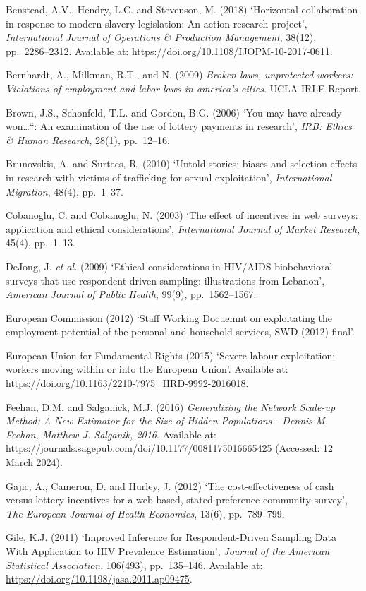 \documentclass[
  12pt,
  letterpaper,
  DIV=11,
  numbers=noendperiod]{scrartcl}
\begin{document}
Benstead, A.V., Hendry, L.C. and Stevenson, M. (2018) `Horizontal
collaboration in response to modern slavery legislation: An action
research project', \emph{International Journal of Operations \&
Production Management}, 38(12), pp.~2286--2312. Available at:
\url{https://doi.org/10.1108/IJOPM-10-2017-0611}.

Bernhardt, A., Milkman, R.T., and N. (2009) \emph{Broken laws,
unprotected workers: Violations of employment and labor laws in
america's cities}. UCLA IRLE Report.

Brown, J.S., Schonfeld, T.L. and Gordon, B.G. (2006) `You may have
already won\ldots``: An examination of the use of lottery payments in
research', \emph{IRB: Ethics \& Human Research}, 28(1), pp.~12--16.

Brunovskis, A. and Surtees, R. (2010) `Untold stories: biases and
selection effects in research with victims of trafficking for sexual
exploitation', \emph{International Migration}, 48(4), pp.~1--37.

Cobanoglu, C. and Cobanoglu, N. (2003) `The effect of incentives in web
surveys: application and ethical considerations', \emph{International
Journal of Market Research}, 45(4), pp.~1--13.

DeJong, J. \emph{et al.} (2009) `Ethical considerations in HIV/AIDS
biobehavioral surveys that use respondent-driven sampling: illustrations
from Lebanon', \emph{American Journal of Public Health}, 99(9),
pp.~1562--1567.

European Commission (2012) `Staff Working Docuemnt on exploitating the
employment potential of the personal and household services, SWD (2012)
final'.

European Union for Fundamental Rights (2015) `Severe labour
exploitation: workers moving within or into the European Union'.
Available at: \url{https://doi.org/10.1163/2210-7975_HRD-9992-2016018}.

Feehan, D.M. and Salganick, M.J. (2016) \emph{Generalizing the Network
Scale-up Method: A New Estimator for the Size of Hidden Populations -
Dennis M. Feehan, Matthew J. Salganik, 2016}. Available at:
\url{https://journals.sagepub.com/doi/10.1177/0081175016665425}
(Accessed: 12 March 2024).

Gajic, A., Cameron, D. and Hurley, J. (2012) `The cost-effectiveness of
cash versus lottery incentives for a web-based, stated-preference
community survey', \emph{The European Journal of Health Economics},
13(6), pp.~789--799.

Gile, K.J. (2011) `Improved Inference for Respondent-Driven Sampling
Data With Application to HIV Prevalence Estimation', \emph{Journal of
the American Statistical Association}, 106(493), pp.~135--146. Available
at: \url{https://doi.org/10.1198/jasa.2011.ap09475}.
\end{document}
